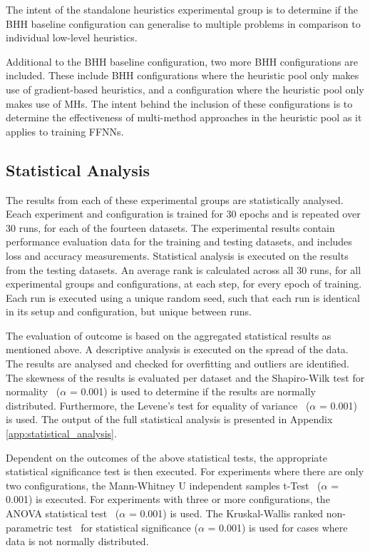The intent of the standalone heuristics experimental group is to determine if the \acs{BHH} baseline configuration can generalise to multiple problems in comparison to individual low-level heuristics.

Additional to the \acs{BHH} baseline configuration, two more \acs{BHH} configurations are included. These include \acs{BHH} configurations where the heuristic pool only makes use of gradient-based heuristics, and a configuration where the heuristic pool only makes use of \acp{MH}. The intent behind the inclusion of these configurations is to determine the effectiveness of multi-method approaches in the heuristic pool as it applies to training \acp{FFNN}.

\subsection{Statistical Analysis}
\label{sec:methodology:statistical_analysis}

The results from each of these experimental groups are statistically analysed. Eeach experiment and configuration is trained for 30 epochs and is repeated over 30 runs, for each of the fourteen datasets. The experimental results contain performance evaluation data for the training and testing datasets, and includes loss and accuracy measurements. Statistical analysis is executed on the results from the testing datasets. An average rank is calculated across all 30 runs, for all experimental groups and configurations, at each step, for every epoch of training. Each run is executed using a unique random seed, such that each run is identical in its setup and configuration, but unique between runs.

The evaluation of outcome is based on the aggregated statistical results as mentioned above. A descriptive analysis is executed on the spread of the data. The results are analysed and checked for overfitting and outliers are identified. The skewness of the results is evaluated per dataset and the Shapiro-Wilk test for normality~\cite{ref:shapiro:1965} ($\alpha$ = 0.001) is used to determine if the results are normally distributed. Furthermore, the Levene's test for equality of variance~\cite{ref:levene:1961} ($\alpha$ = 0.001) is used. The output of the full statistical analysis is presented in Appendix \ref{app:statistical_analysis}.

Dependent on the outcomes of the above statistical tests, the appropriate statistical significance test is then executed. For experiments where there are only two configurations, the Mann-Whitney U independent samples t-Test~\cite{ref:mann:1947} ($\alpha$ = 0.001) is executed. For experiments with three or more configurations, the \acs{ANOVA} statistical test~\cite{ref:fisher:1921} ($\alpha$ = 0.001) is used. The Kruskal-Wallis ranked non-parametric test~\cite{ref:kruskal:1952} for statistical significance ($\alpha$ = 0.001) is used for cases where data is not normally distributed.

